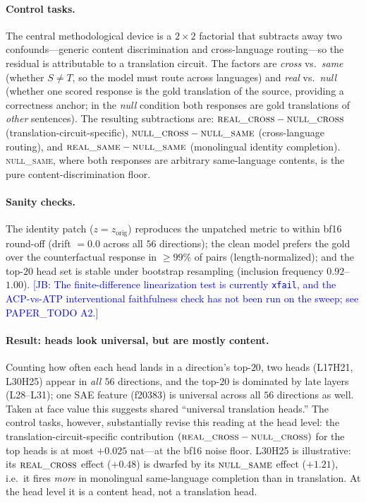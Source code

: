 \documentclass[11pt]{article}
\newcommand{\jb}[1]{\textcolor{blue}{[JB: #1]}} %
\begin{document}
\paragraph{Control tasks.} The central methodological device is a $2\times2$
factorial that subtracts away two confounds---generic content discrimination
and cross-language routing---so the residual is attributable to a translation
circuit. The factors are \emph{cross} vs.\ \emph{same} (whether $S\!\neq\!T$, so
the model must route across languages) and \emph{real} vs.\ \emph{null} (whether
one scored response is the gold translation of the source, providing a
correctness anchor; in the \emph{null} condition both responses are gold
translations of \emph{other} sentences). The resulting subtractions are:
$\textsc{real\_cross}-\textsc{null\_cross}$ (translation-circuit-specific),
$\textsc{null\_cross}-\textsc{null\_same}$ (cross-language routing), and
$\textsc{real\_same}-\textsc{null\_same}$ (monolingual identity completion).
\textsc{null\_same}, where both responses are arbitrary same-language contents,
is the pure content-discrimination floor.

\paragraph{Sanity checks.} The identity patch ($z=z_{\text{orig}}$) reproduces
the unpatched metric to within bf16 round-off (drift $=0.0$ across all $56$
directions); the clean model prefers the gold over the counterfactual response
in $\geq99\%$ of pairs (length-normalized); and the top-$20$ head set is stable
under bootstrap resampling (inclusion frequency $0.92$--$1.00$). \jb{The
finite-difference linearization test is currently \texttt{xfail}, and the
ACP-vs-ATP interventional faithfulness check has not been run on the sweep; see
PAPER\_TODO A2.}

\paragraph{Result: heads look universal, but are mostly content.} Counting how
often each head lands in a direction's top-$20$, two heads (L17H21, L30H25)
appear in \emph{all $56$} directions, and the top-$20$ is dominated by late
layers (L28--L31); one SAE feature (f20383) is universal across all $56$
directions as well. Taken at face value this suggests shared ``universal
translation heads.'' The control tasks, however, substantially revise this
reading at the head level: the translation-circuit-specific contribution
$(\textsc{real\_cross}-\textsc{null\_cross})$ for the top heads is at most
$+0.025$ nat---at the bf16 noise floor. L30H25 is illustrative: its
$\textsc{real\_cross}$ effect ($+0.48$) is dwarfed by its $\textsc{null\_same}$
effect ($+1.21$), i.e.\ it fires \emph{more} in monolingual same-language
completion than in translation. At the head level it is a content head, not a
translation head.
\end{document}
